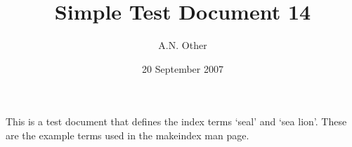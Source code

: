 \documentclass{article}
\date{20 September 2007}
\author{A.N. Other}
\title{Simple Test Document 14}
\begin{document}
\maketitle

This is a test document that def{}ines the index terms `seal' and `sea
lion'.  These are the example terms used in the makeindex man page.

\printindex
\end{document}
